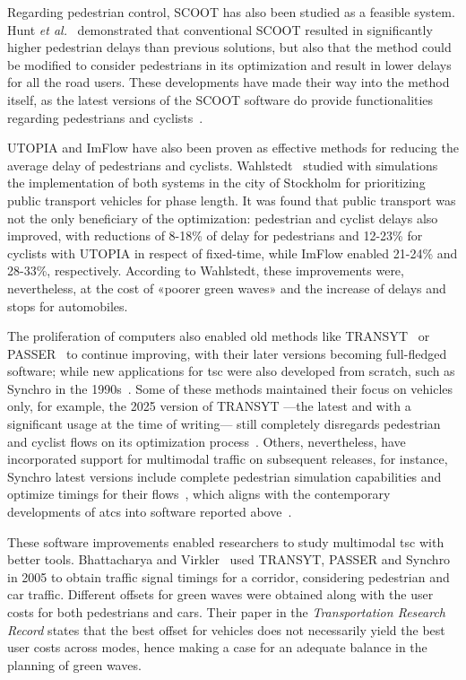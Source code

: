 Regarding pedestrian control, SCOOT has also been studied as a feasible system. Hunt \textit{et al.}~\cite{Hunt1991} demonstrated that conventional SCOOT resulted in significantly higher pedestrian delays than previous solutions, but also that the method could be modified to consider pedestrians in its optimization and result in lower delays for all the road users. These developments have made their way into the method itself, as the latest versions of the SCOOT software do provide functionalities regarding pedestrians and cyclists~\cite{Scoot2020}.

UTOPIA and ImFlow have also been proven as effective methods for reducing the average delay of pedestrians and cyclists. Wahlstedt~\cite{Wahlstedt2013} studied with simulations the implementation of both systems in the city of Stockholm for prioritizing public transport vehicles for phase length. It was found that public transport was not the only beneficiary of the optimization: pedestrian and cyclist delays also improved, with reductions of 8-18\% of delay for pedestrians and 12-23\% for cyclists with UTOPIA in respect of fixed-time, while ImFlow enabled 21-24\% and 28-33\%, respectively. According to Wahlstedt, these improvements were, nevertheless, at the cost of «poorer green waves» and the increase of delays and stops for automobiles.

The proliferation of computers also enabled old methods like TRANSYT~\cite{Transyt2025} or PASSER~\cite{Chaudhary1993} to continue improving, with their later versions becoming full-fledged software; while new applications for \gls{tsc} were also developed from scratch, such as Synchro in the 1990s~\cite{Synchro2026}. Some of these methods maintained their focus on vehicles only, for example, the 2025 version of TRANSYT —the latest and with a significant usage at the time of writing— still completely disregards pedestrian and cyclist flows on its optimization process~\cite{Transyt2025}. Others, nevertheless, have incorporated support for multimodal traffic on subsequent releases, for instance, Synchro latest versions include complete pedestrian simulation capabilities and optimize timings for their flows~\cite{Synchro2026}, which aligns with the contemporary developments of \gls{atcs} into software reported above~\cite{Scoot2020}.

These software improvements enabled researchers to study multimodal \gls{tsc} with better tools. Bhattacharya and Virkler~\cite{Bhattacharya2005} used TRANSYT, PASSER and Synchro in 2005 to obtain traffic signal timings for a corridor, considering pedestrian and car traffic. Different offsets for green waves were obtained along with the user costs for both pedestrians and cars. Their paper in the \textit{Transportation Research Record} states that the best offset for vehicles does not necessarily yield the best user costs across modes, hence making a case for an adequate balance in the planning of green waves.

